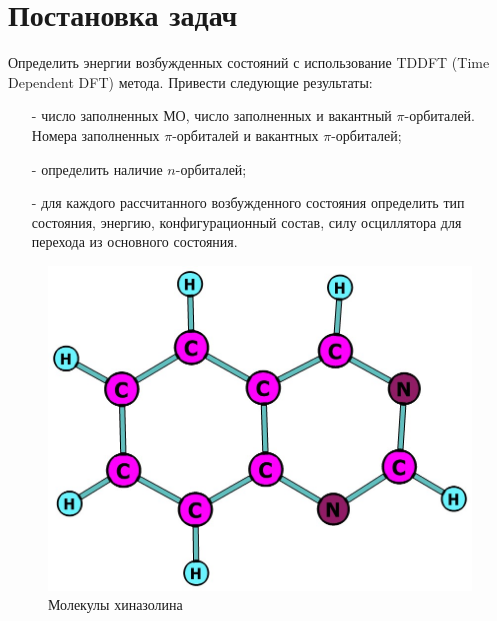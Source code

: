 \section{Постановка задач}
Определить энергии возбужденных состояний с использование TDDFT (Time Dependent DFT) метода. Привести следующие результаты:
\begin{itemize}
    \item[-] число заполненных МО, число заполненных и вакантный $\pi$-орбиталей. Номера заполненных $\pi$-орбиталей и вакантных $\pi$-орбиталей;
    \item[-] определить наличие $n$-орбиталей;
    \item[-] для каждого рассчитанного возбужденного состояния определить тип состояния, энергию, конфигурационный состав, силу осциллятора для перехода из основного состояния.
\end{itemize}

\begin{figure}[H]
\centering
\captionsetup{justification=centering}
\includegraphics[scale=0.4]{fig/1.jpg}
\caption{Молекулы хиназолина}
\end{figure}